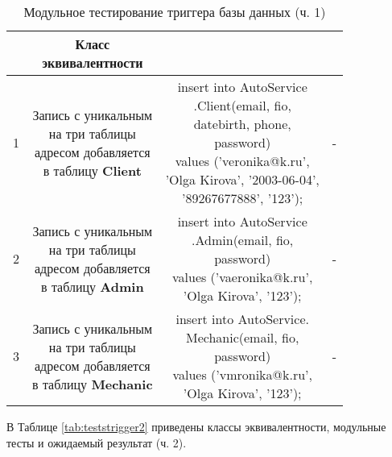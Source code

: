 \begin{table}[H]
	\centering
	\caption{\label{tab:teststrigger1}Модульное тестирование триггера базы данных (ч. 1)}
	\begin{tabular}{|l|c|c|c|}
		\hline \specialcell{№} & \specialcell{Класс\\эквивалентности} & \specialcell{Запрос для теста} & \specialcell{Результат}\\\hline
		1 & \makecell{Запись с уникальным\\на три таблицы\\адресом добавляется\\в таблицу \textbf{Client}} & \makecell{insert into AutoService\\.Client(email, fio,\\ datebirth, phone, \\password)\\values ('veronika@k.ru', \\'Olga Kirova', '2003-06-04', \\'89267677888', '123');} & -\\\hline
		2 & \makecell{Запись с уникальным\\на три таблицы\\адресом добавляется\\в таблицу \textbf{Admin}} & \makecell{insert into AutoService\\.Admin(email, fio,\\ password)\\values ('vaeronika@k.ru',\\'Olga Kirova', '123');} & - \\\hline
		3 & \makecell{Запись с уникальным\\на три таблицы\\адресом добавляется\\в таблицу \textbf{Mechanic}} & \makecell{insert into AutoService.\\Mechanic(email, fio,\\ password)\\values ('vmronika@k.ru',\\'Olga Kirova', '123');} & - \\\hline
	\end{tabular}
\end{table}

В Таблице \ref{tab:teststrigger2} приведены классы эквивалентности, модульные тесты и ожидаемый результат (ч. 2).

